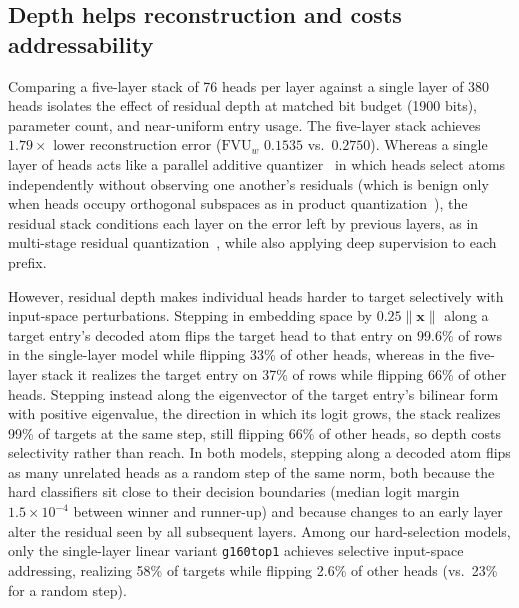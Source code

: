 \subsection{Depth helps reconstruction and costs addressability}
\label{sec:prelim-depth}
Comparing a five-layer stack of 76 heads per layer against a single layer
of 380 heads isolates the effect of residual depth at matched bit budget
(1900 bits), parameter count, and near-uniform entry usage. The five-layer
stack achieves $1.79\times$ lower reconstruction error ($\mathrm{FVU}_w$
$0.1535$ vs.\ $0.2750$). Whereas a single layer of heads acts like a
parallel additive quantizer~\cite{babenko2014} in which heads select
atoms independently without observing one another's residuals (which is
benign only when heads occupy orthogonal subspaces as in product
quantization~\cite{jegou2011}), the residual stack conditions each layer
on the error left by previous layers, as in multi-stage residual
quantization~\cite{zeghidour2021}, while also applying deep supervision
to each prefix.

However, residual depth makes individual heads harder to target
selectively with input-space perturbations. Stepping in embedding space by
$0.25\lVert\mathbf{x}\rVert$ along a target entry's decoded atom flips
the target head to that entry on 99.6\% of rows in the single-layer model
while flipping 33\% of other heads, whereas in the five-layer stack it
realizes the target entry on 37\% of rows while flipping 66\% of other
heads. Stepping instead along the eigenvector of the target entry's
bilinear form with positive eigenvalue, the direction in which its logit
grows, the stack realizes 99\% of targets at the same step, still flipping
66\% of other heads, so depth costs selectivity rather than reach. In both models, stepping along a decoded atom flips as many
unrelated heads as a random step of the same norm, both because the hard
classifiers sit close to their decision boundaries (median logit margin
$1.5\times10^{-4}$ between winner and runner-up) and because changes to
an early layer alter the residual seen by all subsequent layers. Among
our hard-selection models, only the single-layer linear variant
\texttt{g160top1} achieves selective input-space addressing, realizing
58\% of targets while flipping 2.6\% of other heads (vs.\ 23\% for a
random step).


